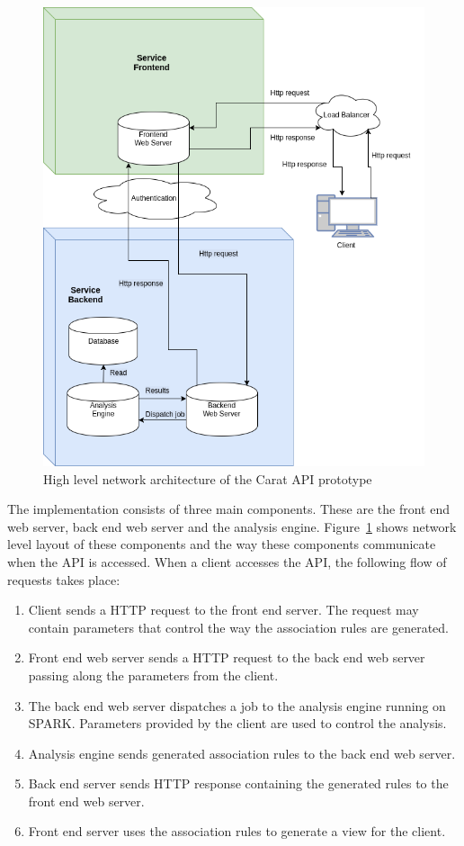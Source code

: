 \begin{figure} %
	\centering
	\includegraphics[width=\textwidth]{images/carat-prototype-architecture.png}
	\caption{High level network architecture of the Carat API prototype}
	\label{figure:carat-api-network-prototype}
\end{figure}         

The implementation consists of three main components. These are the front end web server, back end web server and the analysis engine. Figure~\ref{figure:carat-api-network-prototype} shows network level layout of these components and the way these components communicate when the API is accessed. When a client accesses the API, the following flow of requests takes place:
\begin{enumerate}
	\item Client sends a HTTP request to the front end server. The request may contain parameters that control the way the association rules are generated.
	\item Front end web server sends a HTTP request to the back end web server passing along the parameters from the client.
	\item The back end web server dispatches a job to the analysis engine running on SPARK. Parameters provided by the client are used to control the analysis.
	\item Analysis engine sends generated association rules to the back end web server.
	\item Back end server sends HTTP response containing the generated rules to the front end web server.
	\item Front end server uses the association rules to generate a view for the client.  
\end{enumerate}

